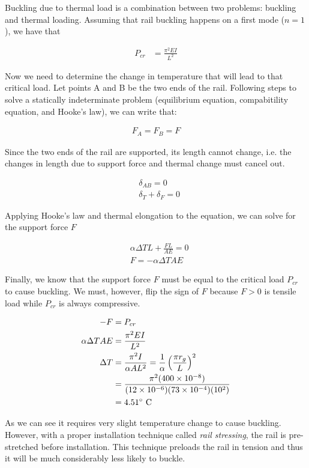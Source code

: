\documentclass[
10pt,
a4paper,
openany,
svgnames,
]{kaobook} %
\begin{document}
\begin{solution}

  Buckling due to thermal load is a combination between two problems: buckling and thermal loading. Assuming that rail buckling happens on a first mode ($n = 1$), we have that

  \begin{align*}
    P_{cr} &= \frac{ \pi^2 EI }{ L^2 } 
  \end{align*}

  Now we need to determine the change in temperature that will lead to that critical load. Let points A and B be the two ends of the rail. Following steps to solve a statically indeterminate problem (equilibrium equation, compabitility equation, and Hooke's law), we can write that:

  \begin{align*}
    F_A = F_B = F
  \end{align*}

  Since the two ends of the rail are supported, its length cannot change, i.e. the changes in length due to support force and thermal change must cancel out.

  \begin{align*}
    &\delta_{AB} = 0 \\
    &\delta_T + \delta_F = 0
  \end{align*}

  Applying Hooke's law and thermal elongation to the equation, we can solve for the support force $F$

  \begin{align*}
    &\alpha \Delta T L + \frac {FL}{AE} = 0 \\
    &F = -\alpha \Delta T A E
  \end{align*}

  Finally, we know that the support force $F$ must be equal to the critical load $P_{cr}$ to cause buckling. We must, however, flip the sign of $F$ because $F > 0$ is tensile load while $P_{cr}$ is always compressive.

  \begin{align*}
    -F &= P_{cr} \\
    \alpha \Delta T A E &= \frac{ \pi^2 EI }{ L^2 } \\
    \Delta T &= \frac{ \pi^2 I }{ \alpha A L^2} = \frac{1}{\alpha} \left( \frac{ \pi r_g }{L} \right)^2 \\
       &= \frac{ \pi^2 (400 \times 10^{-8}) }{ (12 \times 10^{-6})(73 \times 10^{-4})(10^2)}\\
       &= 4.51\degree \text{ C}
  \end{align*}

  As we can see it requires very slight temperature change to cause buckling. However, with a proper installation technique called \emph{rail stressing}, the rail is pre-stretched before installation. This technique preloads the rail in tension and thus it will be much considerably less likely to buckle.
\end{solution}
\end{document}

